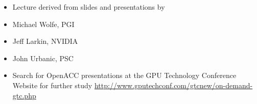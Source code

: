 \documentclass[c,mathserif,compress,xcolor=svgnames]{beamer}
\begin{document}
\begin{frame}
  \begin{itemize}
    \item[] Lecture derived from slides and presentations by
    \item Michael Wolfe, PGI
    \item Jeff Larkin, NVIDIA
    \item John Urbanic, PSC
    \item[] Search for OpenACC presentations at the GPU Technology Conference Website for further study \url{http://www.gputechconf.com/gtcnew/on-demand-gtc.php}
  \end{itemize}
\end{frame}
\end{document}
